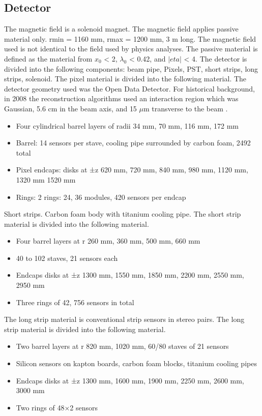 \documentclass{article}
\begin{document}
\subsection{Detector}
The magnetic field is a solenoid magnet. The magnetic field applies passive material only. rmin = 1160 mm, rmax = 1200 mm, 3 m long. The magnetic field used is not identical to the field used by physics analyses. The passive material is defined as the material from $x_0$ < 2, $\lambda_0$ < 0.42, and $|eta|$ < 4. The detector is divided into the following components: beam pipe, Pixels, PST, short strips, long strips, solenoid. The pixel material is divided into the following material. The detector geometry used was the Open Data Detector. For historical background, in 2008 the reconstruction algorithms used an interaction region which was Gaussian, 5.6 cm in the beam axis, and 15 $\mu$m transverse to the beam \cite{Piacquadio2008}.
\begin{itemize}
\item Four cylindrical barrel layers of radii 34 mm, 70 mm, 116 mm, 172 mm
\item Barrel: 14 sensors per stave, cooling pipe surrounded by carbon foam, 2492 total
\item Pixel endcaps: disks at ±z 620 mm, 720 mm, 840 mm, 980 mm, 1120 mm, 1320 mm 1520 mm
\item Rings: 2 rings: 24, 36 modules, 420 sensors per endcap
\end{itemize}
Short strips. Carbon foam body with titanium cooling pipe. The short strip material is divided into the following material.
\begin{itemize}
\item Four barrel layers at r 260 mm, 360 mm, 500 mm, 660 mm
\item 40 to 102 staves, 21 sensors each
\item Endcaps disks at ±z 1300 mm, 1550 mm, 1850 mm, 2200 mm, 2550 mm, 2950 mm
\item Three rings of 42, 756 sensors in total
\end{itemize}
The long strip material is conventional strip sensors in stereo pairs. The long strip material is divided into the following material.
\begin{itemize}
\item Two barrel layers at r 820 mm, 1020 mm, 60/80 staves of 21 sensors
\item Silicon sensors on kapton boards, carbon foam blocks, titanium cooling pipes
\item Endcaps disks at ±z 1300 mm, 1600 mm, 1900 mm, 2250 mm, 2600 mm, 3000 mm
\item Two rings of 48×2 sensors
\end{itemize}
\end{document}
